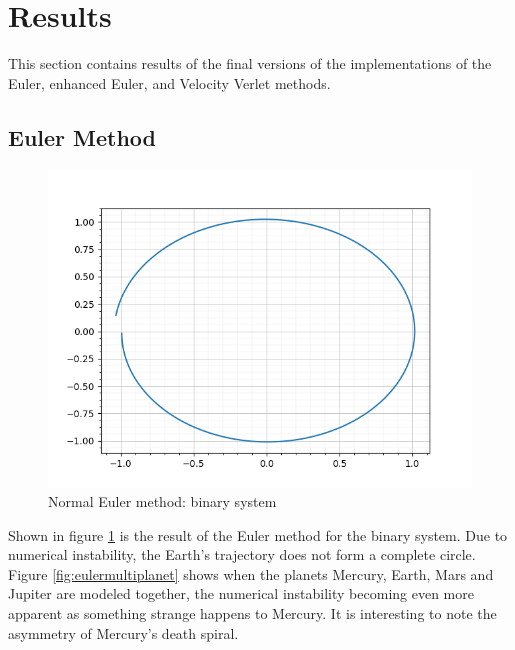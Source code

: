 \documentclass[12pt]{article} %
\begin{document}
\section{Results}
This section contains results of the final versions of the implementations of the Euler, enhanced Euler, and Velocity Verlet methods. 
\newcommand{\scaleA}{0.65} %

\subsection{Euler Method}
\begin{figure}
	\includegraphics[scale=\scaleA]{binary_euler.png}
	\centering
	\caption{Normal Euler method: binary system}
	\label{fig:eulerbinary}
\end{figure}
Shown in figure \ref{fig:eulerbinary} is the result of the Euler method for the binary system. Due to numerical instability, the Earth's trajectory does not form a complete circle. Figure \ref{fig:eulermultiplanet} shows when the planets Mercury, Earth, Mars and Jupiter are modeled together, the numerical instability becoming even more apparent as something strange happens to Mercury. It is interesting to note the asymmetry of Mercury's death spiral.
\end{document}

